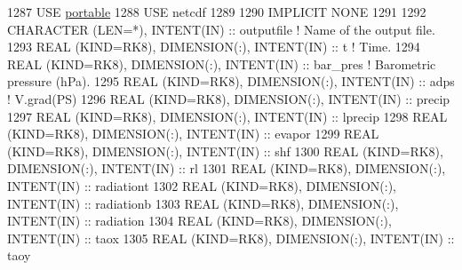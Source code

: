 \begin{DoxyCode}
1287     \textcolor{keywordtype}{USE }\hyperlink{namespaceportable}{portable}
1288     \textcolor{keywordtype}{USE }netcdf
1289 
1290     \textcolor{keywordtype}{IMPLICIT NONE}
1291 
1292     \textcolor{keywordtype}{CHARACTER (LEN=*)}, \textcolor{keywordtype}{INTENT(IN)}                                       :: outputfile   \textcolor{comment}{! Name of the
       output file.}
1293     \textcolor{keywordtype}{REAL (KIND=RK8)}, \textcolor{keywordtype}{DIMENSION(:)}, \textcolor{keywordtype}{INTENT(IN)}                           :: t            \textcolor{comment}{! Time.}
1294     \textcolor{keywordtype}{REAL (KIND=RK8)}, \textcolor{keywordtype}{DIMENSION(:)}, \textcolor{keywordtype}{INTENT(IN)}                           :: bar\_pres     \textcolor{comment}{! Barometric
       pressure (hPa).}
1295     \textcolor{keywordtype}{REAL (KIND=RK8)}, \textcolor{keywordtype}{DIMENSION(:)}, \textcolor{keywordtype}{INTENT(IN)}                           :: adps         \textcolor{comment}{! V.grad(PS)}
1296     \textcolor{keywordtype}{REAL (KIND=RK8)}, \textcolor{keywordtype}{DIMENSION(:)}, \textcolor{keywordtype}{INTENT(IN)}                           :: precip
1297     \textcolor{keywordtype}{REAL (KIND=RK8)}, \textcolor{keywordtype}{DIMENSION(:)}, \textcolor{keywordtype}{INTENT(IN)}                           :: lprecip
1298     \textcolor{keywordtype}{REAL (KIND=RK8)}, \textcolor{keywordtype}{DIMENSION(:)}, \textcolor{keywordtype}{INTENT(IN)}                           :: evapor
1299     \textcolor{keywordtype}{REAL (KIND=RK8)}, \textcolor{keywordtype}{DIMENSION(:)}, \textcolor{keywordtype}{INTENT(IN)}                           :: shf
1300     \textcolor{keywordtype}{REAL (KIND=RK8)}, \textcolor{keywordtype}{DIMENSION(:)}, \textcolor{keywordtype}{INTENT(IN)}                           :: rl
1301     \textcolor{keywordtype}{REAL (KIND=RK8)}, \textcolor{keywordtype}{DIMENSION(:)}, \textcolor{keywordtype}{INTENT(IN)}                           :: radiationt
1302     \textcolor{keywordtype}{REAL (KIND=RK8)}, \textcolor{keywordtype}{DIMENSION(:)}, \textcolor{keywordtype}{INTENT(IN)}                           :: radiationb
1303     \textcolor{keywordtype}{REAL (KIND=RK8)}, \textcolor{keywordtype}{DIMENSION(:)}, \textcolor{keywordtype}{INTENT(IN)}                           :: radiation
1304     \textcolor{keywordtype}{REAL (KIND=RK8)}, \textcolor{keywordtype}{DIMENSION(:)}, \textcolor{keywordtype}{INTENT(IN)}                           :: taox
1305     \textcolor{keywordtype}{REAL (KIND=RK8)}, \textcolor{keywordtype}{DIMENSION(:)}, \textcolor{keywordtype}{INTENT(IN)}                           :: taoy

\end{DoxyCode}
